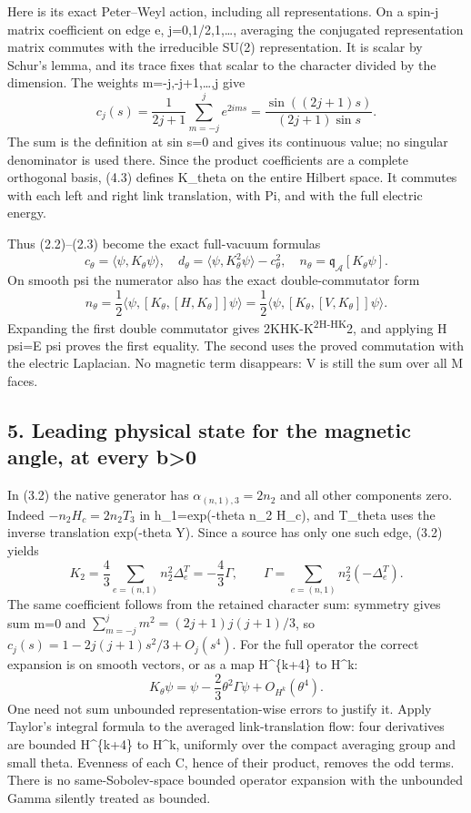 \documentclass[
  11pt,
]{article}
\begin{document}
Here is its exact Peter--Weyl action, including all representations. On
a spin-j matrix coefficient on edge e, j=0,1/2,1,\ldots, averaging the
conjugated representation matrix commutes with the irreducible SU(2)
representation. It is scalar by Schur's lemma, and its trace fixes that
scalar to the character divided by the dimension. The weights
m=-j,-j+1,\ldots,j give \[
 c_j(s)=\frac{1}{2j+1}\sum_{m=-j}^j e^{2ims}
 =\frac{\sin((2j+1)s)}{(2j+1)\sin s}.
\tag{4.3}
\] The sum is the definition at sin s=0 and gives its continuous value;
no singular denominator is used there. Since the product coefficients
are a complete orthogonal basis, (4.3) defines K\_theta on the entire
Hilbert space. It commutes with each left and right link translation,
with Pi, and with the full electric energy.

Thus (2.2)--(2.3) become the exact full-vacuum formulas \[
 c_\theta=\langle\psi,K_\theta\psi\rangle,\quad
 d_\theta=\langle\psi,K_\theta^2\psi\rangle-c_\theta^2,
\quad n_\theta=\mathfrak q_{\mathcal A}[K_\theta\psi].
\tag{4.4}
\] On smooth psi the numerator also has the exact double-commutator form
\[
 n_\theta=\frac12\langle\psi,
 [K_\theta,[H,K_\theta]]\psi\rangle
 =\frac12\langle\psi,[K_\theta,[V,K_\theta]]\psi\rangle.
\tag{4.5}
\] Expanding the first double commutator gives
2KHK-K\textsuperscript{2H-HK}2, and applying H psi=E psi proves the
first equality. The second uses the proved commutation with the electric
Laplacian. No magnetic term disappears: V is still the sum over all M
faces.

\subsection{5. Leading physical state for the magnetic angle, at every
b\textgreater0}\label{magnetic-part-1-leading-physical-state-for-the-magnetic-angle-at-every-b0}

In (3.2) the native generator has \(\alpha_{(n,1),3}=2n_2\) and all
other components zero. Indeed \(-n_2H_c=2n_2T_3\) in h\_1=exp(-theta
n\_2 H\_c), and T\_theta uses the inverse translation exp(-theta Y).
Since a source has only one such edge, (3.2) yields \[
 K_2=\frac43\sum_{e=(n,1)}n_2^2\Delta_e^T
 =-\frac43\Gamma,
\qquad \Gamma=\sum_{e=(n,1)}n_2^2(-\Delta_e^T).
\tag{5.1}
\] The same coefficient follows from the retained character sum:
symmetry gives sum m=0 and \(\sum_{m=-j}^jm^2=(2j+1)j(j+1)/3\), so
\(c_j(s)=1-2j(j+1)s^2/3+O_j(s^4)\). For the full operator the correct
expansion is on smooth vectors, or as a map H\^{}\{k+4\} to H\^{}k: \[
 K_\theta\psi=\psi-\frac23\theta^2\Gamma\psi
                  +O_{H^k}(\theta^4).
\tag{5.2}
\] One need not sum unbounded representation-wise errors to justify it.
Apply Taylor's integral formula to the averaged link-translation flow:
four derivatives are bounded H\^{}\{k+4\} to H\^{}k, uniformly over the
compact averaging group and small theta. Evenness of each C, hence of
their product, removes the odd terms. There is no same-Sobolev-space
bounded operator expansion with the unbounded Gamma silently treated as
bounded.
\end{document}
